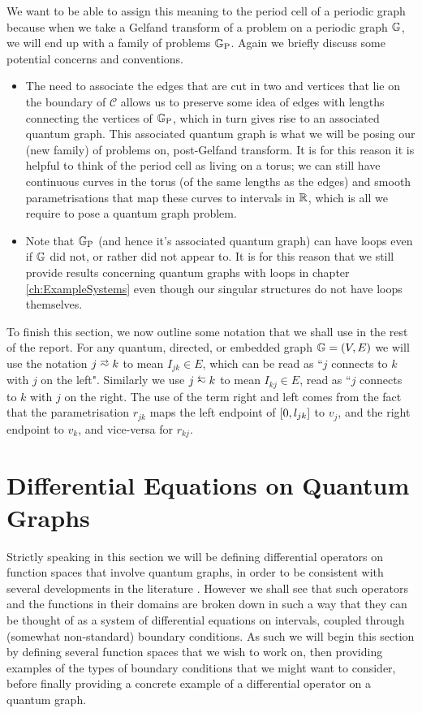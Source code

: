 We want to be able to assign this meaning to the period cell of a periodic graph because when we take a Gelfand transform of a problem on a periodic graph $\mathbb{G}$, we will end up with a family of problems $\mathbb{G}_{\mathrm{P}}$.
Again we briefly discuss some potential concerns and conventions.
\begin{itemize}
	\item The need to associate the edges that are cut in two and vertices that lie on the boundary of $\mathcal{C}$ allows us to preserve some idea of edges with lengths connecting the vertices of $\mathbb{G}_{\mathrm{P}}$, which in turn gives rise to an associated quantum graph.
	This associated quantum graph is what we will be posing our (new family) of problems on, post-Gelfand transform.
	It is for this reason it is helpful to think of the period cell as living on a torus; we can still have continuous curves in the torus (of the same lengths as the edges) and smooth parametrisations that map these curves to intervals in $\mathbb{R}$, which is all we require to pose a quantum graph problem.
	\item Note that $\mathbb{G}_{\mathrm{P}}$ (and hence it's associated quantum graph) can have loops even if $\mathbb{G}$ did not, or rather did not appear to.
	It is for this reason that we still provide results concerning quantum graphs with loops in chapter \ref{ch:ExampleSystems} even though our singular structures do not have loops themselves.
\end{itemize}
To finish this section, we now outline some notation that we shall use in the rest of the report.
For any quantum, directed, or embedded graph $\mathbb{G}=\left( V,E \right)$ we will use the notation $j\conLeft k$ to mean $I_{jk}\in E$, which can be read as ``$j$ connects to $k$ with $j$ on the left".
Similarly we use $j\conRight k$ to mean $I_{kj}\in E$, read as ``$j$ connects to $k$ with $j$ on the right.
The use of the term right and left comes from the fact that the parametrisation $r_{jk}$ maps the left endpoint of $\left[ 0,l_{jk} \right]$ to $v_j$, and the right endpoint to $v_k$, and vice-versa for $r_{kj}$.

\section{Differential Equations on Quantum Graphs} \label{sec:DEonQG}
Strictly speaking in this section we will be defining differential operators on function spaces that involve quantum graphs, in order to be consistent with several developments in the literature .
However we shall see that such operators and the functions in their domains are broken down in such a way that they can be thought of as a system of differential equations on intervals, coupled through (somewhat non-standard) boundary conditions.
As such we will begin this section by defining several function spaces that we wish to work on, then providing examples of the types of boundary conditions that we might want to consider, before finally providing a concrete example of a differential operator on a quantum graph. \newline

